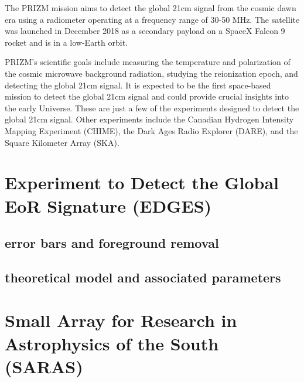 \documentclass[12pt, TexShade, letterpaper]{report}
\begin{document}
\begin{enumerate}
The PRIZM mission aims to detect the global 21cm signal from the cosmic dawn era using a radiometer operating at a frequency range of 30-50 MHz. The satellite was launched in December 2018 as a secondary payload on a SpaceX Falcon 9 rocket and is in a low-Earth orbit.

PRIZM's scientific goals include measuring the temperature and polarization of the cosmic microwave background radiation, studying the reionization epoch, and detecting the global 21cm signal. It is expected to be the first space-based mission to detect the global 21cm signal and could provide crucial insights into the early Universe.
These are just a few of the experiments designed to detect the global 21cm signal. Other experiments include the Canadian Hydrogen Intensity Mapping Experiment (CHIME), the Dark Ages Radio Explorer (DARE), and the Square Kilometer Array (SKA).
\end{enumerate}
\section{Experiment to Detect the Global EoR Signature (EDGES)}
\subsection{error bars and foreground removal}
\subsection{theoretical model and associated parameters}
\section{Small Array for Research in Astrophysics of the South (SARAS)}
\end{document}
